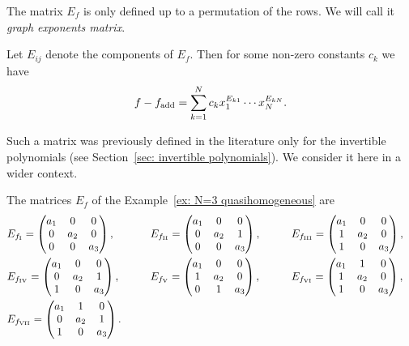 \documentclass[10pt,a4paper]{amsart}
\numberwithin{equation}{section}
\begin{document}
The matrix $E_f$ is only defined up to a permutation of the rows. We will call it \textit{graph exponents matrix}.

Let $E_{ij}$ denote the components of $E_f$. Then for some non-zero constants $c_k$ we have
\begin{equation}\label{eq: poly from graph exponents matrix}
 	f - f_{\rm add} = \sum_{k=1}^N c_k x_1^{E_{k1}} \cdots x_N^{E_{kN}}.
\end{equation}

\begin{Remark}
	Such a matrix was previously defined in the literature only for the invertible polynomials (see Section~\ref{sec: invertible polynomials}). We consider it here in a wider context.
\end{Remark}

\begin{Example}
	The matrices $E_f$ of the Example~\ref{ex: N=3 quasihomogeneous} are
	\begin{alignat*}{4}
		& E_{f_{\rm I}} = \begin{pmatrix}
					a_1 & 0 & 0 \\ 0 & a_2 & 0 \\ 0 & 0 & a_3
		 \end{pmatrix},
		\qquad&&
		E_{f_{\rm II}} = \begin{pmatrix}
			a_1 & 0 & 0 \\ 0 & a_2 & 1 \\ 0 & 0 & a_3
			\end{pmatrix},
		\qquad&&
		E_{f_{\rm III}} = \begin{pmatrix}
			a_1 & 0 & 0 \\ 1 & a_2 & 0 \\ 1 & 0 & a_3
			\end{pmatrix},&
\\&		E_{f_{\rm IV}} = \begin{pmatrix}
			a_1 & 0 & 0 \\ 0 & a_2 & 1 \\ 1 & 0 & a_3
			\end{pmatrix},
		\qquad &&E_{f_{\rm V}} = \begin{pmatrix}
			a_1 & 0 & 0 \\ 1 & a_2 & 0 \\ 0 & 1 & a_3
			\end{pmatrix},
		\qquad&&
		E_{f_{\rm VI}} = \begin{pmatrix}
			a_1 & 1 & 0 \\ 1 & a_2 & 0 \\ 1 & 0 & a_3
			\end{pmatrix},&
		\\&
		E_{f_{\rm VII}} = \begin{pmatrix}
			a_1 & 1 & 0 \\ 0 & a_2 & 1 \\ 1 & 0 & a_3
			\end{pmatrix}.&&&&&
	\end{alignat*}
\end{Example}
\end{document}
